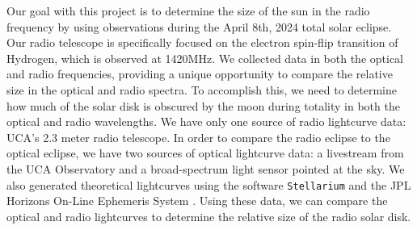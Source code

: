 Our goal with this project is to determine the size of the sun in the radio frequency by using observations during the April 8th, 2024 total solar eclipse.
Our radio telescope is specifically focused on the electron spin-flip transition of Hydrogen, which is observed at 1420MHz.
We collected data in both the optical and radio frequencies, providing a unique opportunity to compare the relative size in the optical and radio spectra.
To accomplish this, we need to determine how much of the solar disk is obscured by the moon during totality in both the optical and radio wavelengths.
We have only one source of radio lightcurve data: UCA's 2.3 meter radio telescope.
In order to compare the radio eclipse to the optical eclipse, we have two sources of optical lightcurve data: a livestream from the UCA Observatory and a broad-spectrum light sensor pointed at the sky.
We also generated theoretical lightcurves using the software \texttt{Stellarium}\cite{zotti_simulated_2020} and the JPL Horizons On-Line Ephemeris System \cite{nasa_jpl_solar_system_dynamics_group_jpl_nodate}.
Using these data, we can compare the optical and radio lightcurves to determine the relative size of the radio solar disk.
